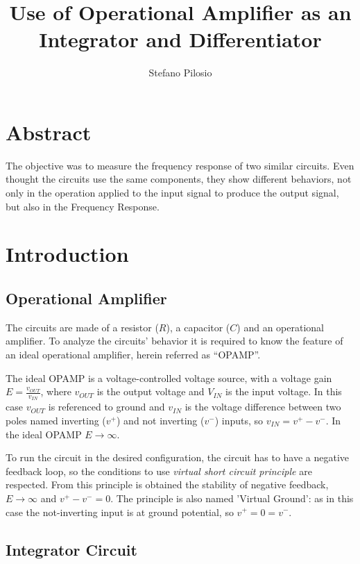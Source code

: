 \documentclass[a4paper, twocolumn]{article}
\begin{document}
\title{Use of Operational Amplifier as  an Integrator and Differentiator}
\author{Stefano Pilosio}

\maketitle

\section{Abstract}
The objective was to measure the frequency response of two similar circuits. Even thought the circuits use the same components, they show different behaviors, not only in the operation applied to the input signal to produce the output signal, but also in the Frequency Response.

\section{Introduction}

\subsection{Operational Amplifier} 

The circuits are made of a resistor ($R$), a capacitor ($C$) and an operational amplifier. To analyze the circuits' behavior it is required to know the feature of an ideal operational amplifier, herein referred as ``OPAMP''.

The ideal OPAMP is a voltage-controlled voltage source, with a voltage gain $E = \frac{v_{OUT}}{v_{IN}}$, where $v_{OUT}$ is the output voltage and $V_{IN}$ is the input voltage. In this case $v_{OUT}$ is referenced to ground and $v_{IN}$ is the voltage difference between two poles named  inverting ($v^+$) and not inverting ($v^-$) inputs, so $v_{IN}=v^+ -v^-$. In the ideal OPAMP $E\to\infty$.

To run the circuit in the desired configuration, the circuit has to have a negative feedback loop, so the conditions to use \emph{virtual short circuit principle} are respected. From this principle is obtained the stability of negative feedback, $E\to\infty$ and $v^+-v^-=0$. The principle is also named 'Virtual Ground': as in this case the not-inverting input is at ground potential, so $v^+=0=v^-$.

\subsection{Integrator Circuit}
\label{sec:integr}
\end{document}
